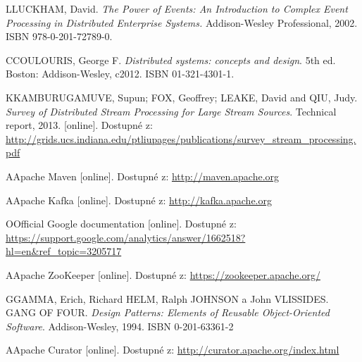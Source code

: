 \documentclass[
  digital, %
  table,   %
  nolof,     %
  nolot,     %
  oneside, %
  nocover,
  monochrome,
  12pt
]{fithesis3}
\begin{document}
\begin{thebibliography}{99}
\bibitem
LLUCKHAM, David. \textit{The Power of Events: An Introduction to Complex
Event Processing in Distributed Enterprise Systems.} Addison-Wesley Professional, 2002. ISBN 978-0-201-72789-0. \label{bib_1}

\bibitem
CCOULOURIS, George F. \textit{Distributed systems: concepts and design}. 5th ed. Boston: Addison-Wesley, c2012. ISBN 01-321-4301-1. \label{bib_2}

\bibitem
KKAMBURUGAMUVE, Supun; FOX, Geoffrey; LEAKE, David and QIU, Judy. \textit{Survey of Distributed Stream Processing for Large Stream Sources}. Technical report, 2013. [online]. Dostupné z: \url{http://grids.ucs.indiana.edu/ptliupages/publications/survey_stream_processing.pdf} \label{bib_3}

\bibitem
AApache Maven [online]. Dostupné z: \url{http://maven.apache.org} \label{bib_4}

\bibitem
AApache Kafka [online]. Dostupné z: \url{http://kafka.apache.org} \label{bib_5}

\bibitem
OOfficial Google documentation  [online]. Dostupné z: \url{https://support.google.com/analytics/answer/1662518?hl=en&ref_topic=3205717} \label{bib_6}

\bibitem
AApache ZooKeeper [online]. Dostupné z: \url{https://zookeeper.apache.org/} \label{bib_7}

\bibitem
GGAMMA, Erich, Richard HELM, Ralph JOHNSON a John VLISSIDES. GANG OF FOUR. \textit{Design Patterns: Elements of Reusable Object-Oriented Software}. Addison-Wesley, 1994. ISBN 0-201-63361-2 \label{bib_8}

\bibitem
AApache Curator [online]. Dostupné z: \url{http://curator.apache.org/index.html} \label{bib_9}

\end{thebibliography}
\appendix %
\end{document}
